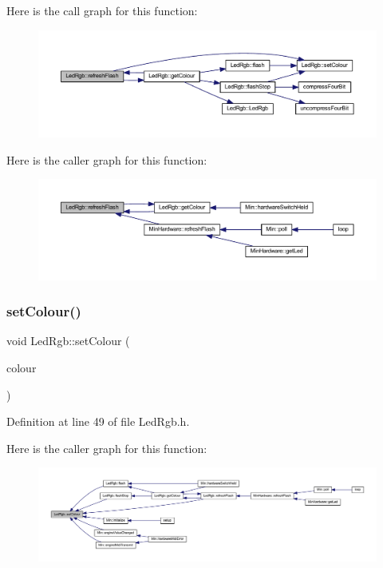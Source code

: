 Here is the call graph for this function\+:
\nopagebreak
\begin{figure}[H]
\begin{center}
\leavevmode
\includegraphics[width=350pt]{class_led_rgb_a31cf89e0117af309c00a60a7ca1bf486_cgraph}
\end{center}
\end{figure}
Here is the caller graph for this function\+:
\nopagebreak
\begin{figure}[H]
\begin{center}
\leavevmode
\includegraphics[width=350pt]{class_led_rgb_a31cf89e0117af309c00a60a7ca1bf486_icgraph}
\end{center}
\end{figure}
\mbox{\label{class_led_rgb_a1bc08ef61237fad334dcc750aa445e36}} 
\subsubsection{\texorpdfstring{set\+Colour()}{setColour()}}
{\footnotesize\ttfamily void Led\+Rgb\+::set\+Colour (\begin{DoxyParamCaption}\item[{\hyperlink{class_led_rgb_af328c665510f921f0dfed643f939087b}{Led\+Rgb\+Colour}}]{colour }\end{DoxyParamCaption})\hspace{0.3cm}{\ttfamily [inline]}}



Definition at line 49 of file Led\+Rgb.\+h.

Here is the caller graph for this function\+:
\nopagebreak
\begin{figure}[H]
\begin{center}
\leavevmode
\includegraphics[width=350pt]{class_led_rgb_a1bc08ef61237fad334dcc750aa445e36_icgraph}
\end{center}
\end{figure}


